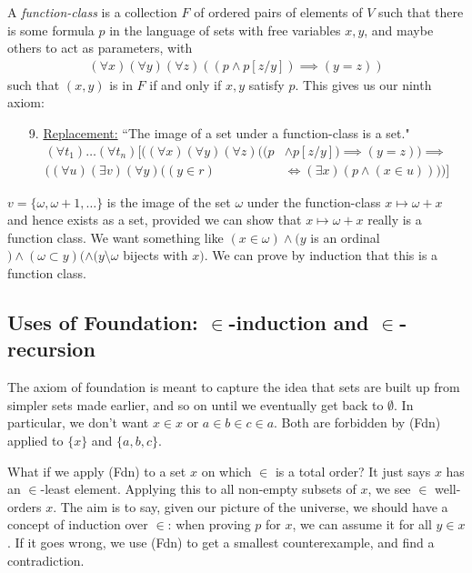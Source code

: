 \documentclass[10pt,a4paper]{article}
\begin{document}
A \emph{function-class} is a collection $F$ of ordered pairs of elements of $V$ such that there is some formula $p$ in the language of sets with free variables $x,y$, and maybe others to act as parameters, with 
\begin{align*}
(\forall x)(\forall y)(\forall z)((p \wedge p[z/y])\implies (y=z))
\end{align*}
such that $(x,y)$ is in $F$ if and only if $x,y$ satisfy $p$.  This gives us our ninth axiom:
\begin{enumerate}
\item[9.] \underline{Replacement:} ``The image of a set under a function-class is a set."
\begin{align*}
(\forall t_1)\ldots(\forall t_n)[((\forall x)(\forall y)(\forall z)((p& \wedge p[z/y])\implies(y=z))\implies\tag{Rep}\\
((\forall u)(\exists v)(\forall y)((y \in r)&\iff(\exists x)(p \wedge (x\in u))))]
\end{align*}
\end{enumerate}
\example $v = \{\omega, \omega+1, \ldots\}$ is the image of the set $\omega$ under the function-class $x \mapsto \omega+x$ and hence exists as a set, provided we can show that $x \mapsto \omega+x$ really is a function class. We want something like $(x\in \omega)\wedge(y$ is an ordinal$)\wedge(\omega \subset y)(\wedge(y\setminus \omega$ bijects with $x)$. We can prove by induction that this is a function class.
\subsection{Uses of Foundation: $\bm{\in}$-induction and $\bm{\in}$-recursion}
The axiom of foundation is meant to capture the idea that sets are built up from simpler sets made earlier, and so on until we eventually get back to $\emptyset$. In particular, we don't want $x \in x$ or $a \in b \in c \in a$. Both are forbidden by (Fdn) applied to $\{x\}$ and $\{a,b,c\}$.

What if we apply (Fdn) to a set $x$ on which $\in$ is a total order? It just says $x$ has an $\in$-least element. Applying this to all non-empty subsets of $x$, we see $\in$ well-orders $x$. The aim is to say, given our picture of the universe, we should have a concept of induction over $\in$: when proving $p$ for $x$, we can assume it for all $y \in x$. If it goes wrong, we use (Fdn) to get a smallest counterexample, and find a contradiction.
\end{document}
